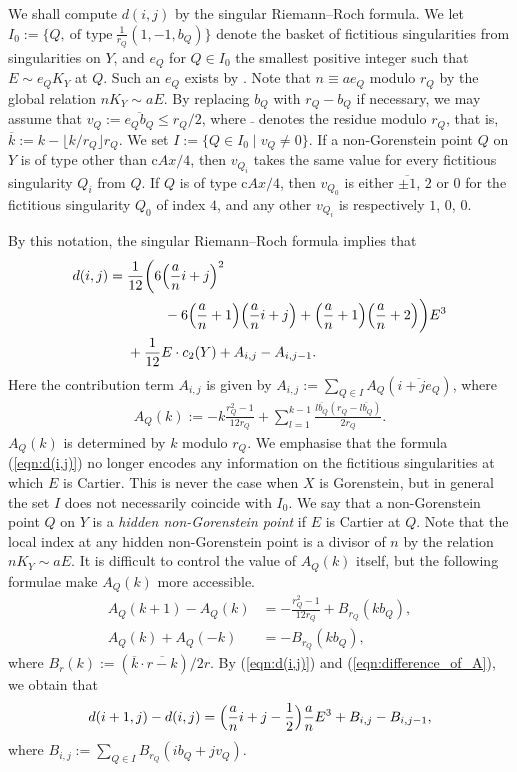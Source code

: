 \documentclass[a4paper,11pt]{amsart}
\theoremstyle{definition}
\theoremstyle{remark}
\numberwithin{equation}{section}
\newcommand{\rd}[1]{\lfloor{#1}\rfloor}
\begin{document}
We shall compute $d(i,j)$ by the singular Riemann--Roch formula.
We let $I_0:=\{Q,\ \textrm{of type} \ \frac{1}{r_Q}(1, -1, b_Q)\}$
denote the basket of fictitious singularities from singularities on $Y$,
and $e_Q$ for $Q \in I_0$ the smallest positive integer
such that $E \sim e_QK_Y$ at $Q$.
Such an $e_Q$ exists by \cite[Corollary 5.2]{Km88}.
Note that $n \equiv ae_Q$ modulo $r_Q$ by the global relation $nK_Y \sim aE$.
By replacing $b_Q$ with $r_Q-b_Q$ if necessary,
we may assume that $v_Q:= \overline{e_Qb_Q}\le r_Q / 2$,
where $\bar{\ }$ denotes the residue modulo $r_Q$,
that is, $\overline{k}:=k-\rd{k/r_Q}r_Q$.
We set $I:=\{Q\in I_0 \mid v_Q\neq0\}$.
If a non-Gorenstein point $Q$ on $Y$ is of type other than c$Ax/4$,
then $v_{Q_i}$ takes the same value
for every fictitious singularity $Q_i$ from $Q$.
If $Q$ is of type c$Ax/4$,
then $v_{Q_0}$ is either $\overline{\pm1}$, $2$ or $0$
for the fictitious singularity $Q_0$ of index $4$,
and any other $v_{Q_i}$ is respectively $1$, $0$, $0$.

By this notation, the singular Riemann--Roch formula implies that
\begin{align}\label{eqn:d(i,j)}
d(i,j)&= \frac{1}{12}
\biggl(6\Bigl(\frac{a}{n}i+j\Bigr)^2 \\
\nonumber& \qquad \qquad -6\Bigl(\frac{a}{n}+1\Bigr)\Bigl(\frac{a}{n}i+j\Bigr)
+\Bigl(\frac{a}{n}+1\Bigr)\Bigl(\frac{a}{n}+2\Bigr)\biggr)E^3 \\
\nonumber&\quad\ +\frac{1}{12} E\cdot c_2(Y) +A_{i,j}-A_{i,j-1}.
\end{align}
Here the contribution term $A_{i,j}$ is given by
$A_{i,j}:=\sum_{Q \in I}A_Q(\overline{i+je_Q})$,
where
\begin{align*}
A_Q(k):=-k\frac{r_Q^2-1}{12r_Q}+\sum_{l=1}^{k-1}
\frac{\overline{lb_Q}(r_Q-\overline{lb_Q})}{2r_Q}.
\end{align*}
$A_Q(k)$ is determined by $k$ modulo $r_Q$.
We emphasise that
the formula (\ref{eqn:d(i,j)}) no longer encodes
any information on the fictitious singularities at which $E$ is Cartier.
This is never the case when $X$ is Gorenstein,
but in general the set $I$ does not necessarily coincide with $I_0$.
We say that a non-Gorenstein point $Q$ on $Y$ is
a \textit{hidden non-Gorenstein point} if $E$ is Cartier at $Q$.
Note that the local index at any hidden non-Gorenstein point
is a divisor of $n$ by the relation $nK_Y \sim aE$.
It is difficult to control the value of $A_Q(k)$ itself,
but the following formulae make $A_Q(k)$ more accessible.
\begin{align}
A_Q(k+1)-A_Q(k)&=-\frac{r_Q^2-1}{12r_Q}+B_{r_Q}(kb_Q),
\label{eqn:difference_of_A} \\
A_Q(k)+A_Q(-k)&=-B_{r_Q}(kb_Q),
\end{align}
where $B_r(k):=(\overline{k}\cdot\overline{r-k})/2r$.
By (\ref{eqn:d(i,j)}) and (\ref{eqn:difference_of_A}),
we obtain that
\begin{align}\label{eqn:difference_of_d(i,j)}
d(i+1,j)-d(i,j)=\Bigl(\frac{a}{n}i+j-\frac{1}{2}\Bigr)\frac{a}{n}E^3
+B_{i,j}-B_{i,j-1},
\end{align}
where $B_{i,j}:=\sum_{Q \in I}B_{r_Q}(ib_Q+jv_Q)$.
\end{document}

